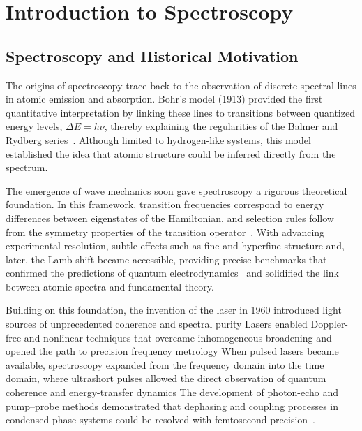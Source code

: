 \chapter{Introduction to Spectroscopy}
\label{copy:chapter_spectroscopy}

\section{Spectroscopy and Historical Motivation}
\label{copy:sec:history}

\noindent
The origins of spectroscopy trace back to the observation of discrete spectral lines in atomic emission and absorption.
Bohr’s model (1913) provided the first quantitative interpretation by linking these lines to transitions between quantized energy levels, $\Delta E = h\nu$, thereby explaining the regularities of the Balmer and Rydberg series~\cite{bohr1913constitutionatomsmolecules, rydberg1890rybergsseriesrydberg1890xxxivstructurelinespectra, balmer1885notizuberspectrallinien}.
Although limited to hydrogen-like systems, this model established the idea that atomic structure could be inferred directly from the spectrum.

The emergence of wave mechanics soon gave spectroscopy a rigorous theoretical foundation.
In this framework, transition frequencies correspond to energy differences between eigenstates of the Hamiltonian, and selection rules follow from the symmetry properties of the transition operator~\cite{dirac1927quantumtheoryemission}. %
With advancing experimental resolution, subtle effects such as fine and hyperfine structure and, later, the Lamb shift became accessible, providing precise benchmarks that confirmed the predictions of quantum electrodynamics~\cite{lambretherford1947finestructurehydrogen, bethe1947electromagneticshiftenergy, hansch2006nobellecturepassion} and solidified the link between atomic spectra and fundamental theory.

Building on this foundation, the invention of the laser in 1960 introduced light sources of unprecedented coherence and spectral purity %
Lasers enabled Doppler-free and nonlinear techniques that overcame inhomogeneous broadening and opened the path to precision frequency metrology%
When pulsed lasers became available, spectroscopy expanded from the frequency domain into the time domain, where ultrashort pulses allowed the direct observation of quantum coherence and energy-transfer dynamics%
The development of photon-echo and pump–probe methods demonstrated that dephasing and coupling processes in condensed-phase systems could be resolved with femtosecond precision~\cite{mukamel1995principlesnonlinearoptical, cho2009twodimensionalopticalspectroscopy}.

